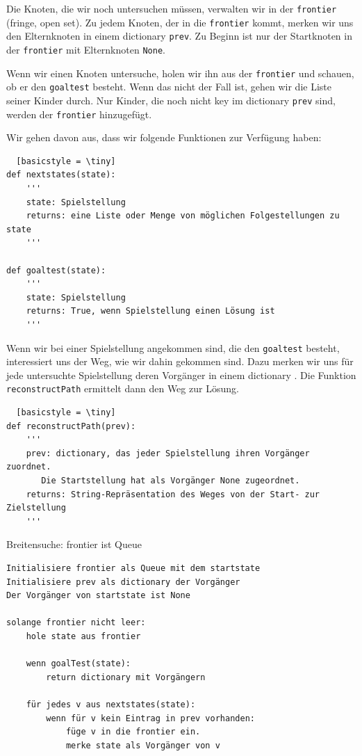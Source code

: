 \begin{frame}[fragile]
Die Knoten, die wir noch untersuchen müssen, verwalten wir in der \texttt{frontier} (fringe, open set).
Zu jedem Knoten, der in die \texttt{frontier} kommt, merken wir uns den Elternknoten in einem dictionary \texttt{prev}.
Zu Beginn ist nur der Startknoten in der \texttt{frontier} mit Elternknoten \texttt{None}.

Wenn wir einen Knoten untersuche, holen wir ihn aus der \texttt{frontier} und schauen, ob er den \texttt{goaltest} besteht.
Wenn das nicht der Fall ist, gehen wir die Liste seiner Kinder durch. Nur Kinder, die noch nicht key im dictionary \texttt{prev} sind, werden der \texttt{frontier} hinzugefügt.

\end{frame}


\begin{frame}[fragile]
\small
Wir gehen davon aus, dass wir folgende Funktionen zur Verfügung haben:

\begin{lstlisting}  [basicstyle = \tiny]
def nextstates(state):
    '''
    state: Spielstellung
    returns: eine Liste oder Menge von möglichen Folgestellungen zu state
    '''

def goaltest(state):
    '''
    state: Spielstellung
    returns: True, wenn Spielstellung einen Lösung ist
    '''
\end{lstlisting} 
\small
Wenn wir bei einer Spielstellung angekommen sind, die den \texttt{goaltest} besteht, interessiert uns der Weg, wie wir dahin gekommen sind. Dazu merken wir uns für jede untersuchte Spielstellung deren Vorgänger in einem dictionary . Die Funktion \texttt{reconstructPath} ermittelt dann den Weg zur Lösung.

\begin{lstlisting}  [basicstyle = \tiny]
def reconstructPath(prev):
    '''
    prev: dictionary, das jeder Spielstellung ihren Vorgänger zuordnet.
       Die Startstellung hat als Vorgänger None zugeordnet.
    returns: String-Repräsentation des Weges von der Start- zur Zielstellung
    '''

\end{lstlisting} 
\end{frame}

\begin{frame}[fragile]
Breitensuche: frontier ist Queue

\begin{lstlisting} 
Initialisiere frontier als Queue mit dem startstate
Initialisiere prev als dictionary der Vorgänger
Der Vorgänger von startstate ist None

solange frontier nicht leer:
    hole state aus frontier
    
    wenn goalTest(state):
        return dictionary mit Vorgängern
    
    für jedes v aus nextstates(state):
        wenn für v kein Eintrag in prev vorhanden:
            füge v in die frontier ein.
            merke state als Vorgänger von v
    

\end{lstlisting} 
\end{frame}

